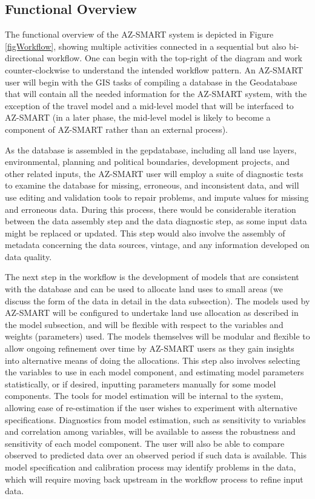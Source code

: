 \subsection{Functional Overview}
The functional overview of the AZ-SMART system is depicted in Figure \ref{figWorkflow}, showing multiple activities connected in a sequential but also bi-directional workflow.  One can begin with the top-right of the diagram and work counter-clockwise to understand the intended workflow pattern.  An AZ-SMART user will begin with the GIS tasks of compiling a database in the Geodatabase that will contain all the needed information for the AZ-SMART system, with the exception of the travel model and a mid-level model that will be interfaced to AZ-SMART (in a later phase, the mid-level model is likely to become a component of AZ-SMART rather than an external process). 

As the database is assembled in the gepdatabase, including all land use layers, environmental, planning and political boundaries, development projects, and other related inputs, the AZ-SMART user will employ a suite of diagnostic tests to examine the database for missing, erroneous, and inconsistent data, and will use editing and validation tools to repair problems, and impute values for missing and erroneous data.  During this process, there would be considerable iteration between the data assembly step and the data diagnostic step, as some input data might be replaced or updated.  This step would also involve the assembly of metadata concerning the data sources, vintage, and any information developed on data quality.

The next step in the workflow is the development of models that are consistent with the database and can be used to allocate land uses to small areas (we discuss the form of the data in detail in the data subsection).  The models used by AZ-SMART will be configured to undertake land use allocation as described in the model subsection, and will be flexible with respect to the variables and weights (parameters) used.  The models themselves will be modular and flexible to allow ongoing refinement over time by AZ-SMART users as they gain insights into alternative means of doing the allocations.  This step also involves selecting the variables to use in each model component, and estimating model parameters statistically, or if desired, inputting parameters manually for some model components.  The tools for model estimation will be internal to the system, allowing ease of re-estimation if the user wishes to experiment with alternative specifications.  Diagnostics from model estimation, such as sensitivity to variables and correlation among variables, will be available to assess the robustness and sensitivity of each model component.  The user will also be able to compare observed to predicted data over an observed period if such data is available.  This model specification and calibration process may identify problems in the data, which will require moving back upstream in the workflow process to refine input data.

